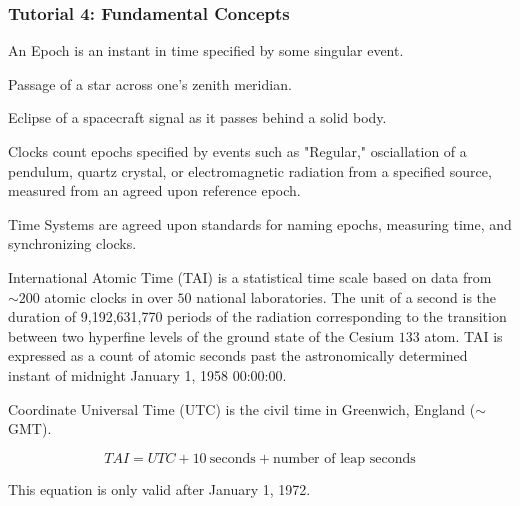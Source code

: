 \documentclass[crop=false,class=book]{standalone}
\begin{document}
            \subsubsection{Tutorial 4: Fundamental Concepts}
            \begin{definition}
            An Epoch is an instant in time specified by some singular event.
            \end{definition}
            \begin{example}
            Passage of a star across one's zenith meridian.
            \end{example}
            \begin{example}
            Eclipse of a spacecraft signal as it passes behind a solid body.
            \end{example}
            \begin{remark}
            Clocks count epochs specified by events such as "Regular," osciallation of a pendulum, quartz crystal, or electromagnetic radiation from a specified source, measured from an agreed upon reference epoch.
            \end{remark}
            \begin{definition}
            Time Systems are agreed upon standards for naming epochs, measuring time, and synchronizing clocks.
            \end{definition}
            \begin{definition}
            International Atomic Time (TAI) is a statistical time scale based on data from $\sim200$ atomic clocks in over $50$ national laboratories. The unit of a second is the duration of 9,192,631,770 periods of the radiation corresponding to the transition between two hyperfine levels of the ground state of the Cesium $133$ atom. TAI is expressed as a count of atomic seconds past the astronomically determined instant of midnight January 1, 1958 00:00:00.
            \end{definition}
            \begin{definition}
            Coordinate Universal Time (UTC) is the civil time in Greenwich, England ($\sim$GMT).
            \end{definition}
            \begin{equation}
            TAI=UTC+10\ \textrm{seconds}+\textrm{number of leap seconds}
            \end{equation}
            \begin{remark}
            This equation is only valid after January 1, 1972.
            \end{remark}
\end{document}
